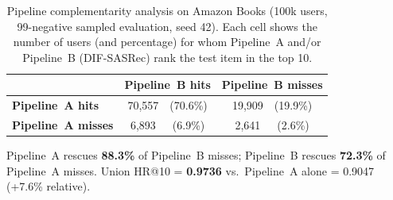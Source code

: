 \begin{table}[H]
\caption{Pipeline complementarity analysis on Amazon Books (100k users,
         99-negative sampled evaluation, seed 42).
         Each cell shows the number of users (and percentage) for whom
         Pipeline~A and/or Pipeline~B (DIF-SASRec) rank the test item
         in the top 10.}
\label{tab:complementarity}
\centering
\begin{tabular}{lcc}
\toprule
 & \textbf{Pipeline~B hits} & \textbf{Pipeline~B misses} \\
\midrule
\textbf{Pipeline~A hits}   & 70{,}557~~(70.6\%) & 19{,}909~~(19.9\%) \\
\textbf{Pipeline~A misses} &  6{,}893~~~(6.9\%) &  2{,}641~~~(2.6\%) \\
\bottomrule
\end{tabular}
\vspace{4pt}

\noindent
Pipeline~A rescues \textbf{88.3\%} of Pipeline~B misses;
Pipeline~B rescues \textbf{72.3\%} of Pipeline~A misses.
Union HR@10 = \textbf{0.9736} vs.\ Pipeline~A alone = 0.9047
(+7.6\% relative).
\end{table}
